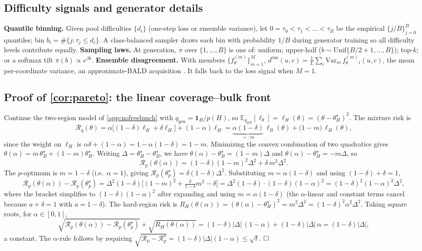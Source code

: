 \documentclass{article}
\theoremstyle{plain}
\theoremstyle{definition}
\theoremstyle{remark}
\newcommand{\E}{\mathbb{E}}
\newcommand{\state}{u}
\newcommand{\param}{c}
\newcommand{\surr}{f_\theta}
\newcommand{\lossf}{\ell_\theta}
\newcommand{\pnat}{p}
\newcommand{\qtr}{q}
\newcommand{\qgen}{q_{\mathrm{gen}}}
\newcommand{\Rp}{\mathcal{R}_{\pnat}}
\newcommand{\Rq}{\mathcal{R}_{\qtr}}
\newcommand{\unif}{\alpha}
\begin{document}
\subsection{Difficulty signals and generator details}\label{app:difficulty}
\textbf{Quantile binning.} Given pool difficulties $\{d_i\}$ (one-step loss or ensemble variance), let
$0=\tau_0<\tau_1<\dots<\tau_B$ be the empirical $\{j/B\}_{j=0}^B$ quantiles; bin $b_i=\#\{j:\tau_j\le d_i\}$.
A class-balanced sampler draws each bin with probability $1/B$ during generator training so all difficulty
levels contribute equally. \textbf{Sampling laws.} At generation, $\pi$ over $\{1,\dots,B\}$ is one of:
uniform; upper-half ($b\sim\mathrm{Unif}\{B/2{+}1,\dots,B\}$); top-$k$; or a softmax tilt
$\pi(b)\propto e^{\beta b}$. \textbf{Ensemble disagreement.} With members $\{\surr^{(m)}\}_{m=1}^{M}$,
$d^{\mathrm{ens}}(\state,\param)=\frac1L\sum_{i}\mathrm{Var}_m\,\surr^{(m)}_i(\state,\param)$, the mean
per-coordinate variance, an approximate-BALD acquisition \citep{houlsby2011bald,beluch2018ensembles}. It
falls back to the loss signal when $M=1$.

\subsection{Proof of \cref{cor:pareto}: the linear coverage--bulk front}\label{app:pareto}
Continue the two-region model of \cref{app:nofreelunch} with $\qgen=\mathbf 1_H/\pnat(H)$, so
$\E_{\qgen}[\lossf]=\ell_H(\theta)=(\theta-\theta_H^\star)^2$. The mixture risk is
\[
  \Rq(\theta)=\unif\big[(1-\delta)\ell_B+\delta\ell_H\big]+(1-\unif)\ell_H
  =\underbrace{\unif(1-\delta)}_{=:m}\,\ell_B(\theta)+\big(1-m\big)\,\ell_H(\theta),
\]
since the weight on $\ell_H$ is $\unif\delta+(1-\unif)=1-\unif(1-\delta)=1-m$. Minimizing the convex
combination of two quadratics gives $\theta(\unif)=m\,\theta_B^\star+(1-m)\theta_H^\star$. Writing
$\Delta=\theta_H^\star-\theta_B^\star$, we have $\theta(\unif)-\theta_B^\star=(1-m)\Delta$ and
$\theta(\unif)-\theta_H^\star=-m\Delta$, so
\[
  \Rp(\theta(\unif))=(1-\delta)(1-m)^2\Delta^2+\delta\,m^2\Delta^2 .
\]
The $\pnat$-optimum is $m=1-\delta$ (i.e.\ $\unif=1$), giving $\Rp(\theta_\pnat^\star)=\delta(1-\delta)\Delta^2$.
Substituting $m=\unif(1-\delta)$ and using $(1-\delta)+\delta=1$,
\[
  \Rp(\theta(\unif))-\Rp(\theta_\pnat^\star)
  =\Delta^2(1-\delta)\big[(1-m)^2+\tfrac{\delta}{1-\delta}m^2-\delta\big]
  =\Delta^2(1-\delta)\cdot(1-\delta)(1-\unif)^2=(1-\delta)^2(1-\unif)^2\Delta^2,
\]
where the bracket simplifies to $(1-\delta)(1-\unif)^2$ after expanding and using $m=\unif(1-\delta)$ (the
$\unif$-linear and constant terms cancel because $a+\delta=1$ with $a=1-\delta$). The hard-region risk is
$R_H(\theta(\unif))=(\theta(\unif)-\theta_H^\star)^2=m^2\Delta^2=(1-\delta)^2\unif^2\Delta^2$. Taking square
roots, for $\unif\in[0,1]$,
\[
  \sqrt{\Rp(\theta(\unif))-\Rp(\theta_\pnat^\star)}+\sqrt{R_H(\theta(\unif))}
  =(1-\delta)|\Delta|\,(1-\unif)+(1-\delta)|\Delta|\,\unif=(1-\delta)|\Delta|,
\]
a constant. The $\unif$-rule follows by requiring $\sqrt{\Rp-\Rp^\star}=(1-\delta)|\Delta|(1-\unif)\le\sqrt t$.
$\hfill\square$
\end{document}
